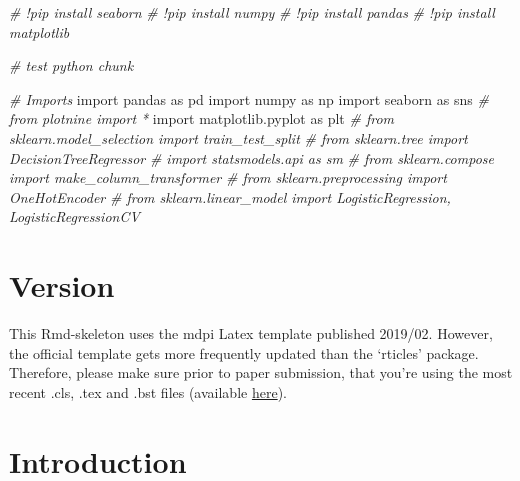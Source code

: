 \documentclass[water,article,submit,moreauthors,pdftex]{mdpi}
\newenvironment{Shaded}{\begin{snugshade}}{\end{snugshade}}
\newcommand{\CommentTok}[1]{\textcolor[rgb]{0.56,0.35,0.01}{\textit{#1}}}
\newcommand{\ImportTok}[1]{#1}
\newcommand{\NormalTok}[1]{#1}
\begin{document}

\begin{Shaded}
\begin{Highlighting}[]
\CommentTok{\# !pip install seaborn}
\CommentTok{\# !pip install numpy}
\CommentTok{\# !pip install pandas}
\CommentTok{\# !pip install matplotlib}
\end{Highlighting}
\end{Shaded}

\begin{Shaded}
\begin{Highlighting}[]
\CommentTok{\# test python chunk}

\CommentTok{\# Imports}
\ImportTok{import}\NormalTok{ pandas }\ImportTok{as}\NormalTok{ pd}
\ImportTok{import}\NormalTok{ numpy }\ImportTok{as}\NormalTok{ np}
\ImportTok{import}\NormalTok{ seaborn }\ImportTok{as}\NormalTok{ sns}
\CommentTok{\# from plotnine import *}
\ImportTok{import}\NormalTok{ matplotlib.pyplot }\ImportTok{as}\NormalTok{ plt}
\CommentTok{\# from sklearn.model\_selection import train\_test\_split}
\CommentTok{\# from sklearn.tree import DecisionTreeRegressor}
\CommentTok{\# import statsmodels.api as sm}
\CommentTok{\# from sklearn.compose import make\_column\_transformer}
\CommentTok{\# from sklearn.preprocessing import OneHotEncoder}
\CommentTok{\# from sklearn.linear\_model import LogisticRegression, LogisticRegressionCV}
\end{Highlighting}
\end{Shaded}

\hypertarget{version}{%
\section{Version}\label{version}}

This Rmd-skeleton uses the mdpi Latex template published 2019/02.
However, the official template gets more frequently updated than the
`rticles' package. Therefore, please make sure prior to paper
submission, that you're using the most recent .cls, .tex and .bst files
(available \href{http://www.mdpi.com/authors/latex}{here}).

\hypertarget{introduction}{%
\section{Introduction}\label{introduction}}
\end{document}
